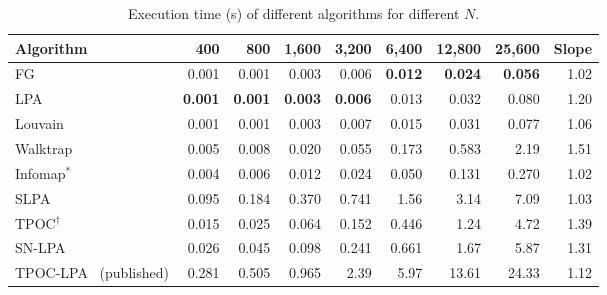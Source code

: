\documentclass[conference]{IEEEtran}
\begin{document}
\begin{table}[!tp]
\centering
\caption{Execution time (s) of different algorithms for different $N$.}
\label{tab:lat}
\footnotesize
\begin{tabular*}{\textwidth}{@{\extracolsep{\fill}}lrrrrrrrr}
\toprule
Algorithm & 400 & 800 & 1{,}600 & 3{,}200 & 6{,}400 & 12{,}800 & 25{,}600 & Slope \\
\midrule
FG & 0.001 & 0.001 & 0.003 & 0.006 & \textbf{0.012} & \textbf{0.024} & \textbf{0.056} & 1.02 \\
LPA & \textbf{0.001} & \textbf{0.001} & \textbf{0.003} & \textbf{0.006} & 0.013 & 0.032 & 0.080 & 1.20 \\
Louvain & 0.001 & 0.001 & 0.003 & 0.007 & 0.015 & 0.031 & 0.077 & 1.06 \\
Walktrap & 0.005 & 0.008 & 0.020 & 0.055 & 0.173 & 0.583 & 2.19 & 1.51 \\
Infomap$^{*}$ & 0.004 & 0.006 & 0.012 & 0.024 & 0.050 & 0.131 & 0.270 & 1.02 \\
SLPA & 0.095 & 0.184 & 0.370 & 0.741 & 1.56 & 3.14 & 7.09 & 1.03 \\
TPOC$^{\dagger}$ & 0.015 & 0.025 & 0.064 & 0.152 & 0.446 & 1.24 & 4.72 & 1.39 \\
SN-LPA & 0.026 & 0.045 & 0.098 & 0.241 & 0.661 & 1.67 & 5.87 & 1.31 \\
\midrule
TPOC-LPA~\cite{kong2026} (published) & 0.281 & 0.505 & 0.965 & 2.39 & 5.97 & 13.61 & 24.33 & 1.12 \\
\bottomrule
\end{tabular*}
\end{table}
\end{document}
